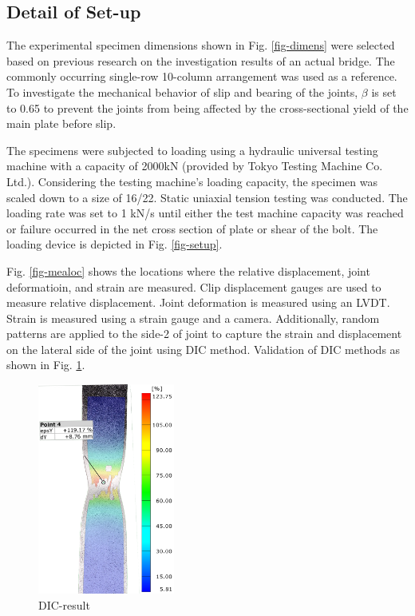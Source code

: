 \subsection{Detail of Set-up}

The experimental specimen dimensions shown in Fig. \ref{fig-dimens} were selected based on previous research\cite{KAMEI2000} on the investigation results of an actual bridge. The commonly occurring single-row 10-column arrangement was used as a reference. To investigate the mechanical behavior of slip and bearing of the joints, $\beta$ is set to 0.65 to prevent the joints from being affected by the cross-sectional yield of the main plate before slip.

The specimens were subjected to loading using a hydraulic universal testing machine with a capacity of 2000kN (provided by Tokyo Testing Machine Co. Ltd.). Considering the testing machine's loading capacity, the specimen was scaled down to a size of 16/22. Static uniaxial tension testing was conducted. The loading rate was set to 1 kN/s until either the test machine capacity was reached or failure occurred in the net cross section of plate or shear of the bolt. The loading device is depicted in Fig. \ref{fig-setup}.

Fig. \ref{fig-mealoc} shows the locations where the relative displacement, joint deformatioin, and strain are measured. Clip displacement gauges are used to measure relative displacement. Joint deformation is measured using an LVDT. Strain is measured using a strain gauge and a camera. Additionally, random patterns are applied to the side-2 of joint to capture the strain and displacement on the lateral side of the joint using \ac{DIC} method. Validation of \ac{DIC} methods as shown in Fig. \ref{fig-dicresult}.

\begin{figure}[htbp]
    \centering
    \includegraphics[width=0.4\textwidth]{imgs/ch6/DIC-RESULT.jpg}
    \caption{DIC-result}
    \label{fig-dicresult}
\end{figure}


